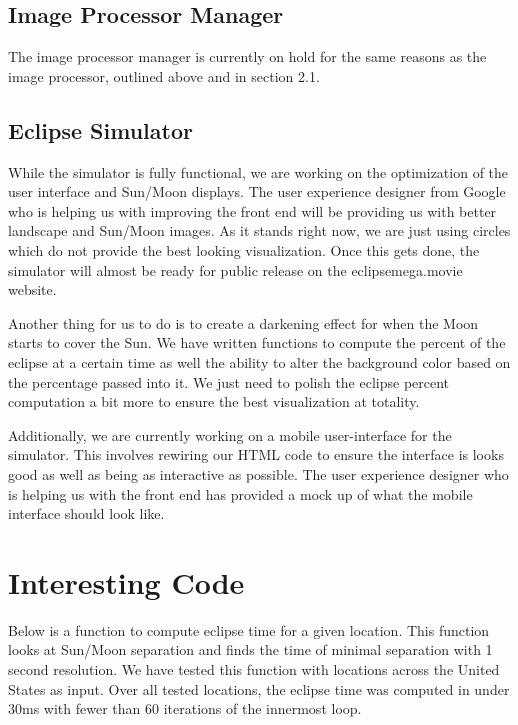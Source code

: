 \documentclass[10pt, onecolumn, draftclsnofoot, letterpaper, compsoc]{IEEEtran}
\begin{document}
\subsection{Image Processor Manager}

The image processor manager is currently on hold for the same reasons as the image
processor, outlined above and in section 2.1.

\subsection{Eclipse Simulator}

While the simulator is fully functional, we are working on the optimization
of the user interface and Sun/Moon displays. The user experience designer
from Google who is helping us with improving the front end will be providing
us with better landscape and Sun/Moon images. As it stands right now, we are
just using circles which do not provide the best looking visualization. Once this
gets done, the simulator will almost be ready for public release on the eclipsemega.movie
website.

Another thing for us to do is to create a darkening effect for when the Moon starts to
cover the Sun. We have written functions to compute the percent of the eclipse
at a certain time as well the ability to alter the background color based on
the percentage passed into it. We just need to polish the eclipse percent computation
a bit more to ensure the best visualization at totality.

Additionally, we are currently working on a mobile user-interface for the
simulator. This involves rewiring our HTML code to ensure the interface is looks
good as well as being as interactive as possible. The user experience designer
who is helping us with the front end has provided a mock up of what the mobile
interface should look like.


\newpage
\section{Interesting Code}

Below is a function to compute eclipse time for a given location. This function looks at Sun/Moon
separation and finds the time of minimal separation with 1 second resolution. We have tested
this function with locations across the United States as input. Over all tested locations, the
eclipse time was computed in under 30ms with fewer than 60 iterations of the innermost loop. \\
\end{document}
